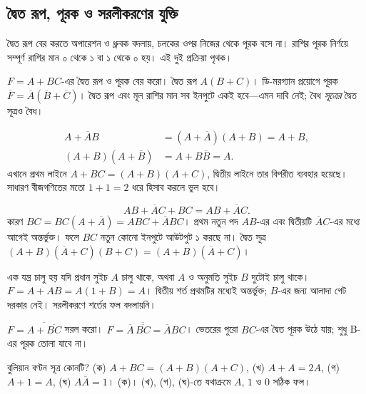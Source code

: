 \subsection{দ্বৈত রূপ, পূরক ও সরলীকরণের যুক্তি}
দ্বৈত রূপ বের করতে অপারেশন ও ধ্রুবক বদলায়, চলকের ওপর নিজের থেকে পূরক বসে না। রাশির পূরক নির্ণয়ে সম্পূর্ণ রাশির মান ০ থেকে ১ বা ১ থেকে ০ হয়। এই দুই প্রক্রিয়া পৃথক।

$F=A+BC$-এর দ্বৈত রূপ ও পূরক বের করো।
\chThreeAnswer দ্বৈত রূপ $A(B+C)$। ডি-মরগ্যান প্রয়োগে পূরক $\overline F=\overline A(\overline B+\overline C)$। দ্বৈত রূপ এবং মূল রাশির মান সব ইনপুটে একই হবে—এমন দাবি নেই; বৈধ \emph{সূত্রের} দ্বৈত সূত্রও বৈধ।

\[\begin{aligned}
A+\overline AB&=(A+\overline A)(A+B)=A+B,\\
(A+B)(A+\overline B)&=A+B\overline B=A.
\end{aligned}\]
এখানে প্রথম লাইনে $A+BC=(A+B)(A+C)$, দ্বিতীয় লাইনে তার বিপরীত ব্যবহার হয়েছে। সাধারণ বীজগণিতের মতো $1+1=2$ ধরে হিসাব করলে ভুল হবে।

\[AB+\overline AC+BC=AB+\overline AC.\]
কারণ $BC=BC(A+\overline A)=ABC+\overline ABC$। প্রথম নতুন পদ $AB$-এর এবং দ্বিতীয়টি $\overline AC$-এর মধ্যে আগেই অন্তর্ভুক্ত। ফলে $BC$ নতুন কোনো ইনপুটে আউটপুট ১ করছে না। দ্বৈত সূত্র $(A+B)(\overline A+C)(B+C)=(A+B)(\overline A+C)$।

এক যন্ত্র চালু হয় যদি প্রধান সুইচ $A$ চালু থাকে, অথবা $A$ ও অনুমতি সুইচ $B$ দুটোই চালু থাকে।
\chThreeAnswer $F=A+AB=A(1+B)=A$। দ্বিতীয় শর্ত প্রথমটির মধ্যেই অন্তর্ভুক্ত; $B$-এর জন্য আলাদা গেট দরকার নেই। সরলীকরণে শর্তের ফল বদলায়নি।

$F=\overline{A+\overline{BC}}$ সরল করো।
\chThreeAnswer $F=\overline A\,\overline{\overline{BC}}=\overline ABC$। ভেতরের পুরো $BC$-এর দ্বৈত পূরক উঠে যায়; শুধু B-এর পূরক তোলা যাবে না।

বুলিয়ান বণ্টন সূত্র কোনটি? (ক) $A+BC=(A+B)(A+C)$, (খ) $A+A=2A$, (গ) $A+1=A$, (ঘ) $A\overline A=1$।
\chThreeAnswer (ক)। (খ), (গ), (ঘ)-তে যথাক্রমে $A$, $1$ ও $0$ সঠিক ফল।
